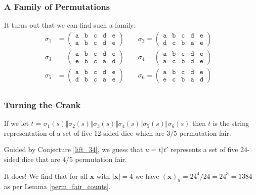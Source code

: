 \documentclass[aspectratio=169]{beamer}
\begin{document}
\begin{frame}[triangle=siiblue]
\frametitle{A Family of Permutations}
It turns out that we can find such a family:
\vfill
\begin{align*}
	\sigma_1 &= \begin{pmatrix}
		\texttt{a} & \texttt{b} & \texttt{c} & \texttt{d} & \texttt{e} \\
		\texttt{a} & \texttt{b} & \texttt{c} & \texttt{d} & \texttt{e}
		\end{pmatrix}
	\qquad
	\sigma_2 = \begin{pmatrix}
		\texttt{a} & \texttt{b} & \texttt{c} & \texttt{d} & \texttt{e} \\
		\texttt{d} & \texttt{c} & \texttt{b} & \texttt{a} & \texttt{e}
		\end{pmatrix} \\
	\sigma_3 &= \begin{pmatrix}
		\texttt{a} & \texttt{b} & \texttt{c} & \texttt{d} & \texttt{e} \\
		\texttt{e} & \texttt{b} & \texttt{c} & \texttt{a} & \texttt{d}
		\end{pmatrix}
	\qquad
	\sigma_4 = \begin{pmatrix}
		\texttt{a} & \texttt{b} & \texttt{c} & \texttt{d} & \texttt{e} \\
		\texttt{a} & \texttt{c} & \texttt{b} & \texttt{d} & \texttt{e}
		\end{pmatrix} \\
	\sigma_5 &= \begin{pmatrix}
		\texttt{a} & \texttt{b} & \texttt{c} & \texttt{d} & \texttt{e} \\
		\texttt{d} & \texttt{b} & \texttt{c} & \texttt{a} & \texttt{e}
		\end{pmatrix}
	\qquad
	\sigma_6 = \begin{pmatrix}
		\texttt{a} & \texttt{b} & \texttt{c} & \texttt{d} & \texttt{e} \\
		\texttt{e} & \texttt{c} & \texttt{b} & \texttt{a} & \texttt{d}
		\end{pmatrix} \\
\end{align*}
\end{frame}

\begin{frame}[triangle=siiblue]
\frametitle{Turning the Crank}
If we let $t$ = $\sigma_1(s) \Vert \sigma_2(s) \Vert \sigma_3(s) \Vert \sigma_4(s) \Vert \sigma_5(s) \Vert \sigma_6(s)$ then $t$ is the string representation of a set of five 12-sided dice which are $3/5$ permutation fair. 

\vfill

Guided by Conjecture \ref{lift_34}, we guess that $u = t \Vert t'$ represents a set of five 24-sided dice that are $4/5$ permutation fair.

\vfill

It does!  We find that for all $\mathbf{x}$ with $|\mathbf{x}| = 4$ we have $(\mathbf{x})_u = 24^4 / 24 = 24^3 = 1384$ as per Lemma \ref{perm_fair_counts}.
\end{frame}
\end{document}
